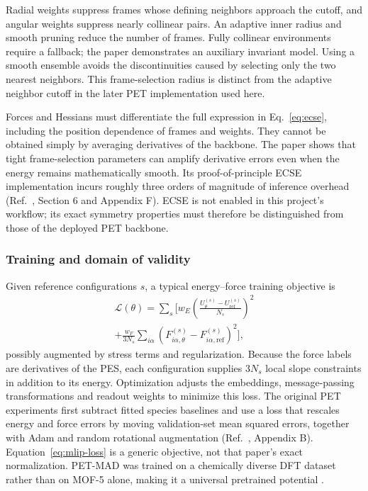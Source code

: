 \documentclass[10pt,a4paper,twocolumn]{article}
\begin{document}
Radial weights suppress frames whose defining neighbors approach the cutoff,
and angular weights suppress nearly collinear pairs. An adaptive inner radius
and smooth pruning reduce the number of frames. Fully collinear environments
require a fallback; the paper demonstrates an auxiliary invariant model.
Using a smooth ensemble avoids the discontinuities caused by selecting only
the two nearest neighbors. This frame-selection radius is distinct from the
adaptive neighbor cutoff in the later PET implementation used here.

Forces and Hessians must differentiate the full expression in
Eq.~\eqref{eq:ecse}, including the position dependence of frames and weights.
They cannot be obtained simply by averaging derivatives of the backbone.
The paper shows that tight frame-selection parameters can amplify derivative
errors even when the energy remains mathematically smooth. Its
proof-of-principle ECSE implementation incurs roughly three orders of
magnitude of inference overhead (Ref.~\cite{pet}, Section 6 and Appendix F).
ECSE is not enabled in this project's workflow; its exact symmetry properties
must therefore be distinguished from those of the deployed PET backbone.

\subsubsection{Training and domain of validity}

Given reference configurations $s$, a typical energy--force training
objective is
\begin{equation}
  \begin{aligned}
  \mathcal L(\theta)=\sum_s\Biggl[{}
    w_E\left(\frac{U_\theta^{(s)}-U_{\mathrm{ref}}^{(s)}}{N_s}\right)^2
  \\
    +\frac{w_F}{3N_s}\sum_{i\alpha}
      \left(F_{i\alpha,\theta}^{(s)}
                 -F_{i\alpha,\mathrm{ref}}^{(s)}\right)^2
  \Biggr],
  \end{aligned}
  \label{eq:mlip-loss}
\end{equation}
possibly augmented by stress terms and regularization. Because the force
labels are derivatives of the PES, each configuration supplies $3N_s$ local
slope constraints in addition to its energy. Optimization adjusts the
embeddings, message-passing transformations and readout weights to minimize
this loss. The original PET experiments first subtract fitted species
baselines and use a loss that rescales energy and force errors by moving
validation-set mean squared errors, together with Adam and random rotational
augmentation (Ref.~\cite{pet}, Appendix B). Equation~\eqref{eq:mlip-loss}
is a generic objective, not that paper's exact normalization. PET-MAD was
trained on a chemically diverse DFT dataset rather than
on MOF-5 alone, making it a universal pretrained potential \cite{petmad}.
\end{document}
